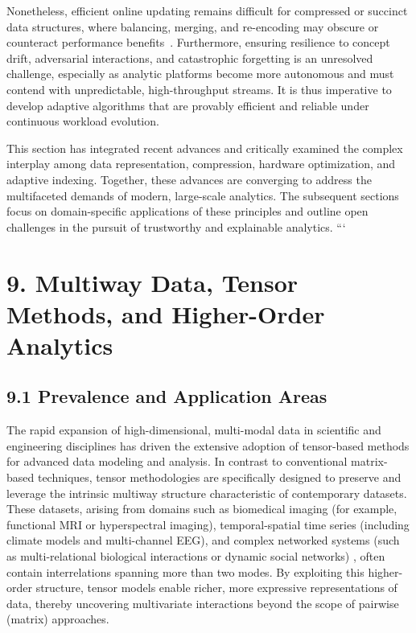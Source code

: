 \documentclass[11pt]{article}
\begin{document}
Nonetheless, efficient online updating remains difficult for compressed or succinct data structures, where balancing, merging, and re-encoding may obscure or counteract performance benefits~\cite{ref80, ref81, ref82, ref108, ref109}. Furthermore, ensuring resilience to concept drift, adversarial interactions, and catastrophic forgetting is an unresolved challenge, especially as analytic platforms become more autonomous and must contend with unpredictable, high-throughput streams. It is thus imperative to develop adaptive algorithms that are provably efficient and reliable under continuous workload evolution.

\bigskip

This section has integrated recent advances and critically examined the complex interplay among data representation, compression, hardware optimization, and adaptive indexing. Together, these advances are converging to address the multifaceted demands of modern, large-scale analytics. The subsequent sections focus on domain-specific applications of these principles and outline open challenges in the pursuit of trustworthy and explainable analytics.
```

\section{9. Multiway Data, Tensor Methods, and Higher-Order Analytics}

\subsection{9.1 Prevalence and Application Areas}

The rapid expansion of high-dimensional, multi-modal data in scientific and engineering disciplines has driven the extensive adoption of tensor-based methods for advanced data modeling and analysis. In contrast to conventional matrix-based techniques, tensor methodologies are specifically designed to preserve and leverage the intrinsic multiway structure characteristic of contemporary datasets. These datasets, arising from domains such as biomedical imaging (for example, functional MRI or hyperspectral imaging), temporal-spatial time series (including climate models and multi-channel EEG), and complex networked systems (such as multi-relational biological interactions or dynamic social networks) \cite{ref104}, often contain interrelations spanning more than two modes. By exploiting this higher-order structure, tensor models enable richer, more expressive representations of data, thereby uncovering multivariate interactions beyond the scope of pairwise (matrix) approaches.
\end{document}
